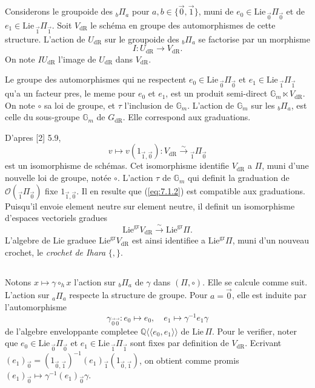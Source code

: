 \documentclass[11pt,a4paper]{article}
\theoremstyle{plain}
\theoremstyle{definition}
\newcommand{\Q}{\mathbb{Q}}
\newcommand{\Gm}{\mathbb{G}_m}
\newcommand{\dR}{\mathrm{dR}}
\newcommand{\gr}{\mathrm{gr}}
\begin{document}
Considerons le groupoide des ${}_b\Pi_a$ pour $a,b \in \{\vec{0},\vec{1}\}$, muni de $e_0 \in \mathrm{Lie}\,{}_{\vec{0}}\Pi_{\vec{0}}$ et de $e_1 \in \mathrm{Lie}\,{}_{\vec{1}}\Pi_{\vec{1}}$. Soit $V_{\dR}$ le sch\'ema en groupe des automorphismes de cette structure. L'action de $U_{\dR}$ sur le groupoide des ${}_b\Pi_a$ se factorise par un morphisme
\begin{equation}\label{eq:7.1.1}
I: U_{\dR} \to V_{\dR}.
\end{equation}
On note $IU_{\dR}$ l'image de $U_{\dR}$ dans $V_{\dR}$.

Le groupe des automorphismes qui ne respectent $e_0 \in \mathrm{Lie}\,{}_{\vec{0}}\Pi_{\vec{0}}$ et $e_1 \in \mathrm{Lie}\,{}_{\vec{1}}\Pi_{\vec{1}}$ qu'a un facteur pres, le meme pour $e_0$ et $e_1$, est un produit semi-direct $\Gm \ltimes V_{\dR}$. On note $\circ$ sa loi de groupe, et $\tau$ l'inclusion de $\Gm$. L'action de $\Gm$ sur les ${}_b\Pi_a$, est celle du sous-groupe $\Gm$ de $G_{\dR}$. Elle correspond aux graduations.

D'apres [2] 5.9,
\begin{equation}\label{eq:7.1.2}
v \mapsto v(1_{\vec{1},\vec{0}}): V_{\dR} \xrightarrow{\sim} {}_{\vec{1}}\Pi_{\vec{0}}
\end{equation}
est un isomorphisme de sch\'emas. Cet isomorphisme identifie $V_{\dR}$ a $\Pi$, muni d'une nouvelle loi de groupe, not\'ee $\circ$. L'action $\tau$ de $\Gm$ qui definit la graduation de $\mathcal{O}({}_{\vec{1}}\Pi_{\vec{0}})$ fixe $1_{\vec{1},\vec{0}}$. Il en resulte que (\ref{eq:7.1.2}) est compatible aux graduations. Puisqu'il envoie element neutre sur element neutre, il definit un isomorphisme d'espaces vectoriels gradues
\begin{equation}\label{eq:7.1.3}
\mathrm{Lie}^{\gr} V_{\dR} \xrightarrow{\sim} \mathrm{Lie}^{\gr} \Pi.
\end{equation}
L'algebre de Lie graduee $\mathrm{Lie}^{\gr} V_{\dR}$ est ainsi identifiee a $\mathrm{Lie}^{\gr} \Pi$, muni d'un nouveau crochet, le \emph{crochet de Ihara} $\{,\}$.

\subsection{}\label{ssec:7.2}

Notons $x \mapsto \gamma \circ_h x$ l'action sur ${}_b\Pi_a$ de $\gamma$ dans $(\Pi, \circ)$. Elle se calcule comme suit. L'action sur ${}_a\Pi_a$ respecte la structure de groupe. Pour $a = \vec{0}$, elle est induite par l'automorphisme
\begin{equation}\label{eq:7.2.1}
\gamma_{\vec{0}\vec{0}}: e_0 \mapsto e_0, \quad e_1 \mapsto \gamma^{-1} e_1 \gamma
\end{equation}
de l'algebre enveloppante completee $\Q\langle\langle e_0,e_1 \rangle\rangle$ de $\mathrm{Lie}\,\Pi$. Pour le verifier, noter que $e_0 \in \mathrm{Lie}\,{}_{\vec{0}}\Pi_{\vec{0}}$ et $e_1 \in \mathrm{Lie}\,{}_{\vec{1}}\Pi_{\vec{1}}$ sont fixes par definition de $V_{\dR}$. Ecrivant $(e_1)_{\vec{0}} = (1_{\vec{0},\vec{1}})^{-1} (e_1)_{\vec{1}} (1_{\vec{0},\vec{1}})$, on obtient comme promis $(e_1)_{\vec{0}} \mapsto \gamma^{-1} (e_1)_{\vec{0}} \gamma$.
\end{document}
